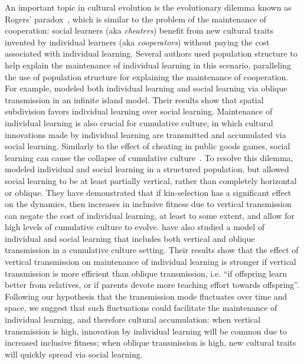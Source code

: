 \documentclass[14pt]{extarticle}
\begin{document}
An important topic in cultural evolution is the evolutionary dilemma known as Rogers' paradox~\citep{Rogers1988}, which is similar to the problem of the maintenance of cooperation: social learners (aka \emph{cheaters}) benefit from new cultural traits invented by individual learners (aka \emph{cooperators}) without paying the cost associated with individual learning.
Several authors used population structure to help explain the maintenance of individual learning in this scenario, paralleling the use of population structure for explaining the maintenance of cooperation.
For example, \citet{Kobayashi2012} modeled both individual learning and social learning via oblique transmission in an infinite island model.
Their results show that spatial subdivision favors individual learning over social learning.
Maintenance of individual learning is also crucial for cumulative culture, in which cultural innovations made by individual learning are transmitted and accumulated via social learning. Similarly to the effect of cheating in public goods games, social learning can cause the collapse of cumulative culture~\citep{Wakano2014}.
To resolve this dilemma, \citet{Ohtsuki2017} modeled individual and social learning in a structured population, but allowed social learning to be at least partially vertical, rather than completely horizontal or oblique. 
They have demonstrated that if kin-selection has a significant effect on the dynamics, then increases in inclusive fitness due to vertical transmission can negate the cost of individual learning, at least to some extent, and allow for high levels of cumulative culture to evolve.
\citet{Mullon2017} have also studied a model of individual and social learning that includes both vertical and oblique transmission in a cumulative culture setting. 
Their results show that the effect of vertical transmission on maintenance of individual learning is stronger if vertical transmission is more efficient than oblique transmission, i.e. ``if offspring learn better from relatives, or if parents devote more teaching effort towards offspring''.
Following our hypothesis that the transmission mode fluctuates over time and space, we suggest that such fluctuations could facilitate the maintenance of individual learning, and therefore cultural accumulation: when vertical transmission is high, innovation by individual learning will be common due to increased inclusive fitness; when oblique transmission is high, new cultural traits will quickly spread via social learning.
\end{document}
